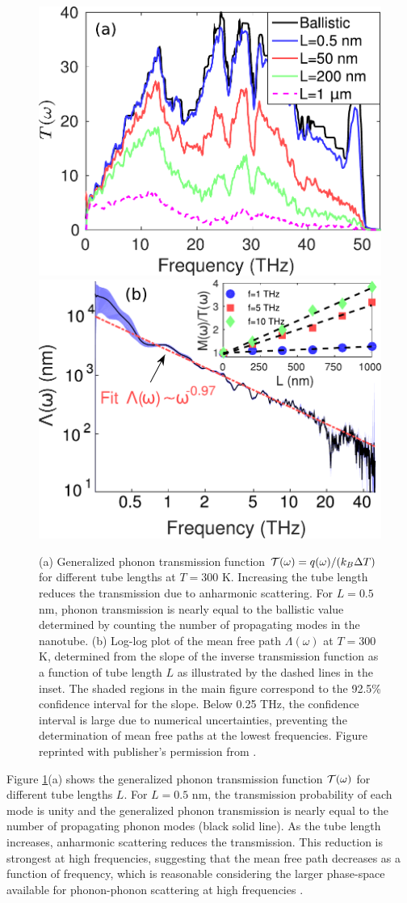 \begin{figure}[tb]
 \begin{center}
  \includegraphics[width=.49\columnwidth]{pics/cnt_fig2_mod.pdf} 
  \includegraphics[width=.49\columnwidth]{pics/cnt_fig4_new.pdf} 
  \caption{(a) Generalized phonon transmission function $\mathcal{T}(\omega)=q(\omega)/(k_B\Delta T)$ for different tube lengths at $T=300$ K. Increasing the tube length reduces the transmission due to anharmonic scattering. For $L=0.5$ nm, phonon transmission is nearly equal to the ballistic value determined by counting the number of propagating modes in the nanotube. (b) Log-log plot of the mean free path $\Lambda(\omega)$ at $T=300$ K, determined from the slope of the inverse transmission function as a function of tube length $L$ as illustrated by the dashed lines in the inset. The shaded regions in the main figure correspond to the 92.5\% confidence interval for the slope. Below 0.25 THz, the confidence interval is large due to numerical uncertainties, preventing the determination of mean free paths at the lowest frequencies. Figure reprinted with publisher's permission from .}  
\label{fig:cnt_fig2}
 \end{center}
\end{figure}

Figure \ref{fig:cnt_fig2}(a) shows the generalized phonon transmission function $\mathcal{T}(\omega)$ for different tube lengths $L$. For $L=0.5$ nm, the transmission probability of each mode is unity and the generalized phonon transmission is nearly equal to the number of propagating phonon modes (black solid line). As the tube length increases, anharmonic scattering reduces the transmission. This reduction is strongest at high frequencies, suggesting that the mean free path decreases as a function of frequency, which is reasonable considering the larger phase-space available for phonon-phonon scattering at high frequencies \cite{ziman}.

